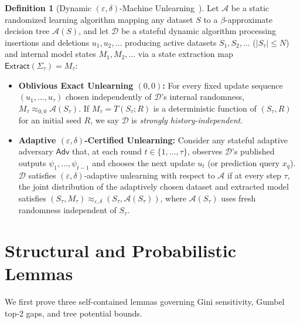 \documentclass[11pt]{article}
\theoremstyle{definition}
\newtheorem{definition}{Definition}
\newcommand{\calA}{\mathcal{A}}
\newcommand{\calD}{\mathcal{D}}
\begin{document}
\begin{definition}[Dynamic $(\varepsilon, \delta)$-Machine Unlearning~\cite{ginart2019making,gupta2021adaptive}]
Let $\calA$ be a static randomized learning algorithm mapping any dataset $S$ to a $\beta$-approximate decision tree $\calA(S)$, and let $\calD$ be a stateful dynamic algorithm processing insertions and deletions $u_1, u_2, \dots$ producing active datasets $S_1, S_2, \dots$ ($|S_\tau| \le N$) and internal model states $M_1, M_2, \dots$ via a state extraction map $\mathsf{Extract}(\Sigma_\tau) = M_\tau$:
\begin{itemize}[leftmargin=1.5em,itemsep=2pt]
    \item \textbf{Oblivious Exact Unlearning $(0,0)$:} For every fixed update sequence $(u_1, \dots, u_\tau)$ chosen independently of $\calD$'s internal randomness, $M_\tau \approx_{0, 0} \calA(S_\tau)$. If $M_\tau = T(S_\tau; R)$ is a deterministic function of $(S_\tau, R)$ for an initial seed $R$, we say $\calD$ is \emph{strongly history-independent}.
    \item \textbf{Adaptive $(\varepsilon, \delta)$-Certified Unlearning:} Consider any stateful adaptive adversary $\mathsf{Adv}$ that, at each round $t \in \{1, \dots, \tau\}$, observes $\calD$'s published outputs $\psi_1, \dots, \psi_{t-1}$ and chooses the next update $u_t$ (or prediction query $x_q$). $\calD$ satisfies $(\varepsilon, \delta)$-adaptive unlearning with respect to $\calA$ if at every step $\tau$, the joint distribution of the adaptively chosen dataset and extracted model satisfies $(S_\tau, M_\tau) \approx_{\varepsilon, \delta} (S_\tau, \calA(S_\tau))$, where $\calA(S_\tau)$ uses fresh randomness independent of $S_\tau$.
\end{itemize}
\end{definition}

\section{Structural and Probabilistic Lemmas}

We first prove three self-contained lemmas governing Gini sensitivity, Gumbel top-2 gaps, and tree potential bounds.
\end{document}
